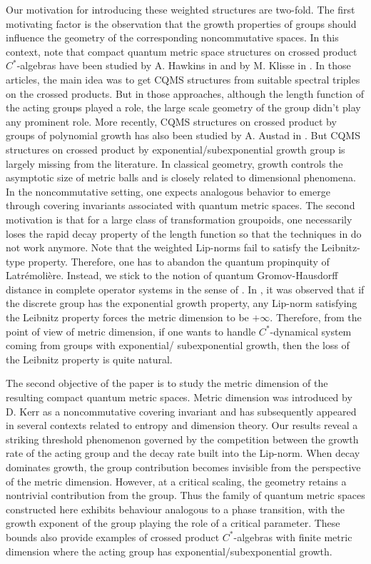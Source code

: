 \documentclass[a4paper,11pt,reqno]{amsart}
\theoremstyle{plain}
\theoremstyle{mainthmstyle}
\theoremstyle{named}
\numberwithin{equation}{section}
\begin{document}
Our motivation for introducing these weighted structures are two-fold. The first motivating factor is the observation that the growth properties of groups should influence the geometry of the corresponding noncommutative spaces. In this context, note that compact quantum metric space structures on crossed product $C^{\ast}$-algebras have been studied by A. Hawkins in \cite{Hawkins-Crossed-CQMS} and by M. Klisse in \cite{Klisse-Crossed-CQMS}. In those articles, the main idea was to get CQMS structures from suitable spectral triples on the crossed products. But in those approaches, although the length function of the acting groups played a role, the large scale geometry of the group didn't play any prominent role. More recently, CQMS structures on crossed product by groups of polynomial growth has also been studied by A. Austad in \cite{Austad-Crossed-CQMS}. But CQMS structures on crossed product by exponential/subexponential growth group is largely missing from the literature. In classical geometry, growth controls the asymptotic size of metric balls and is closely related to dimensional phenomena. In the noncommutative setting, one expects analogous behavior to emerge through covering invariants associated with quantum metric spaces. The second motivation is that for a large class of transformation groupoids, one necessarily loses the rapid decay property of the length function so that the techniques in \cites{Anton-Chris-CQMS, Soumalya-Arnab2} do not work anymore. Note that the weighted Lip-norms fail to satisfy the Leibnitz-type property. Therefore, one has to abandon the quantum propinquity of Latr\'emoli\`ere. Instead, we stick to the notion of quantum Gromov-Hausdorff distance in complete operator systems in the sense of \cite{Kaad-Kyed}. In \cite{Soumalya-Arnab2}, it was observed that if the discrete group has the exponential growth property, any Lip-norm satisfying the Leibnitz property forces the metric dimension to be $+\infty$. Therefore, from the point of view of metric dimension, if one wants to handle $C^{\ast}$-dynamical system coming from groups with exponential/ subexponential growth, then  the loss of the Leibnitz property is quite natural.

The second objective of the paper is to study the metric dimension of the resulting compact quantum metric spaces. Metric dimension was introduced by D. Kerr as a noncommutative covering invariant and has subsequently appeared in several contexts related to entropy and dimension theory. Our results reveal a striking threshold phenomenon governed by the competition between the growth rate of the acting group and the decay rate built into the Lip-norm. When decay dominates growth, the group contribution becomes invisible from the perspective of the metric dimension. However, at a critical scaling, the geometry retains a nontrivial contribution from the group. Thus the family of quantum metric spaces constructed here exhibits behaviour analogous to a phase transition, with the growth exponent of the group playing the role of a critical parameter. These bounds also provide examples of crossed product $C^{\ast}$-algebras with finite metric dimension where the acting group has exponential/subexponential growth. 
\end{document}
